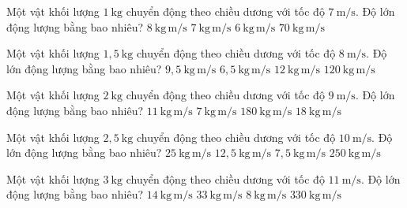 \begin{ex}
Một vật khối lượng $1\ \mathrm{kg}$ chuyển động theo chiều dương với tốc độ $7\ \mathrm{m/s}$. Độ lớn động lượng bằng bao nhiêu?
\choice
{$8\ \mathrm{kg\,m/s}$}
{\True $7\ \mathrm{kg\,m/s}$}
{$6\ \mathrm{kg\,m/s}$}
{$70\ \mathrm{kg\,m/s}$}
\end{ex}

\begin{ex}
Một vật khối lượng $1,5\ \mathrm{kg}$ chuyển động theo chiều dương với tốc độ $8\ \mathrm{m/s}$. Độ lớn động lượng bằng bao nhiêu?
\choice
{$9,5\ \mathrm{kg\,m/s}$}
{$6,5\ \mathrm{kg\,m/s}$}
{\True $12\ \mathrm{kg\,m/s}$}
{$120\ \mathrm{kg\,m/s}$}
\end{ex}

\begin{ex}
Một vật khối lượng $2\ \mathrm{kg}$ chuyển động theo chiều dương với tốc độ $9\ \mathrm{m/s}$. Độ lớn động lượng bằng bao nhiêu?
\choice
{$11\ \mathrm{kg\,m/s}$}
{$7\ \mathrm{kg\,m/s}$}
{$180\ \mathrm{kg\,m/s}$}
{\True $18\ \mathrm{kg\,m/s}$}
\end{ex}

\begin{ex}
Một vật khối lượng $2,5\ \mathrm{kg}$ chuyển động theo chiều dương với tốc độ $10\ \mathrm{m/s}$. Độ lớn động lượng bằng bao nhiêu?
\choice
{\True $25\ \mathrm{kg\,m/s}$}
{$12,5\ \mathrm{kg\,m/s}$}
{$7,5\ \mathrm{kg\,m/s}$}
{$250\ \mathrm{kg\,m/s}$}
\end{ex}

\begin{ex}
Một vật khối lượng $3\ \mathrm{kg}$ chuyển động theo chiều dương với tốc độ $11\ \mathrm{m/s}$. Độ lớn động lượng bằng bao nhiêu?
\choice
{$14\ \mathrm{kg\,m/s}$}
{\True $33\ \mathrm{kg\,m/s}$}
{$8\ \mathrm{kg\,m/s}$}
{$330\ \mathrm{kg\,m/s}$}
\end{ex}

